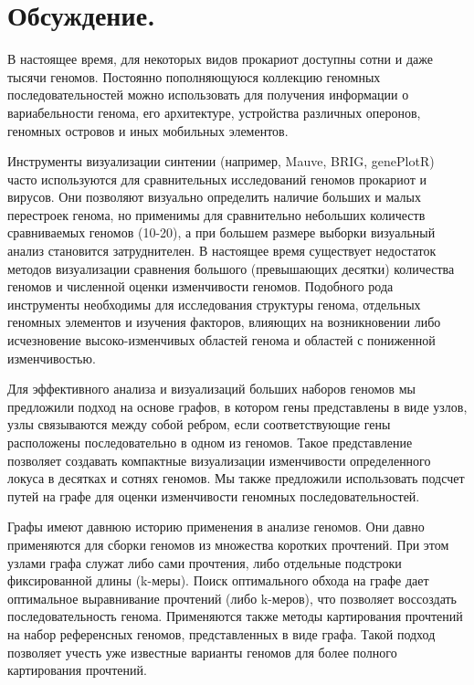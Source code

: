 \graphicspath{{Dissertation/images/}}

\chapter{Обсуждение. } \label{chaptDiscussion}


В настоящее время, для некоторых видов прокариот доступны сотни и даже тысячи геномов. Постоянно пополняющуюся коллекцию геномных последовательностей можно использовать для получения информации о вариабельности генома, его архитектуре, устройства различных оперонов, геномных островов и иных мобильных элементов.

Инструменты визуализации синтении (например, Mauve, BRIG, genePlotR) часто используются для сравнительных исследований геномов прокариот и вирусов. Они позволяют визуально определить наличие больших и малых перестроек генома, но применимы для сравнительно небольших количеств сравниваемых геномов (10-20), а при большем размере выборки визуальный анализ становится затруднителен. В настоящее время существует недостаток методов визуализации сравнения большого (превышающих десятки) количества геномов и численной оценки изменчивости геномов. Подобного рода инструменты необходимы для исследования структуры генома, отдельных геномных элементов и изучения факторов, влияющих на возникновении либо исчезновение высоко-изменчивых областей генома и областей с пониженной изменчивостью.

Для эффективного анализа и визуализаций больших наборов геномов мы предложили подход на основе графов, в котором гены представлены в виде узлов, узлы связываются между собой ребром, если соответствующие гены расположены последовательно в одном из геномов. Такое представление позволяет создавать компактные визуализации изменчивости определенного локуса в десятках и сотнях геномов. Мы также предложили использовать подсчет путей на графе для оценки изменчивости геномных последовательностей. 

Графы имеют давнюю историю применения в анализе геномов. Они давно применяются для сборки геномов из множества коротких прочтений. При этом узлами графа служат либо сами прочтения, либо отдельные подстроки фиксированной длины (k-меры). Поиск оптимального обхода на графе дает оптимальное выравнивание прочтений (либо k-меров), что позволяет воссоздать последовательность генома. Применяются также методы картирования прочтений на набор референсных геномов, представленных в виде графа. Такой подход позволяет учесть уже известные варианты геномов для более полного картирования прочтений. 

